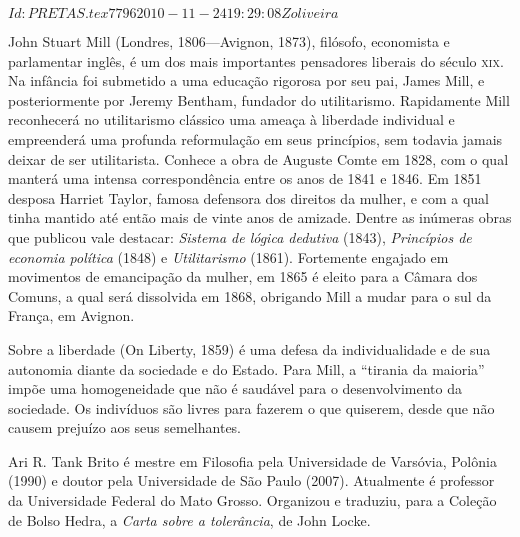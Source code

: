 \SVN $Id: PRETAS.tex 7796 2010-11-24 19:29:08Z oliveira $
\begin{resumopage}

\item[John Stuart Mill] (Londres, 1806---Avignon, 1873), filósofo, 
economista e parlamentar inglês, é um dos mais importantes pensadores 
liberais do século \textsc{xix}. Na infância foi submetido a uma 
educação rigorosa por seu pai, James Mill, e posteriormente por 
Jeremy Bentham, fundador do utilitarismo. Rapidamente Mill 
reconhecerá no utilitarismo clássico uma ameaça à liberdade 
individual e empreenderá uma profunda reformulação em seus 
princípios, sem todavia jamais deixar de ser utilitarista. 
Conhece a obra de Auguste Comte em 1828, com o qual manterá 
uma intensa correspondência entre os anos de 1841 e 1846. 
Em 1851 desposa Harriet Taylor, famosa defensora dos direitos 
da mulher, e com a qual tinha mantido até então mais de vinte 
anos de amizade. Dentre as inúmeras obras que publicou vale 
destacar: \textit{Sistema de lógica dedutiva} (1843), 
\textit{Princípios de economia política} (1848) e \textit{Utilitarismo} (1861). 
Fortemente engajado em movimentos de emancipação da mulher, 
em 1865 é eleito para a Câmara dos Comuns, a qual será dissolvida 
em 1868, obrigando Mill a mudar para o sul da França, em Avignon. 

\item[Sobre a liberdade] (On Liberty, 1859) é uma defesa da individualidade 
e de sua autonomia diante da sociedade e do Estado. Para Mill, a “tirania 
da maioria” impõe uma homogeneidade que não é saudável para o desenvolvimento 
da sociedade. Os indivíduos são livres para fazerem o que quiserem, desde 
que não causem prejuízo aos seus semelhantes.

\item[Ari R. Tank Brito] é mestre em Filosofia pela Universidade 
de Varsóvia, Polônia (1990) e doutor pela Universidade de São Paulo (2007). 
Atualmente é professor da Universidade Federal do Mato Grosso. Organizou 
e traduziu, para a Coleção de Bolso Hedra, a \textit{Carta sobre a tolerância}, de John Locke. 
\end{resumopage}

